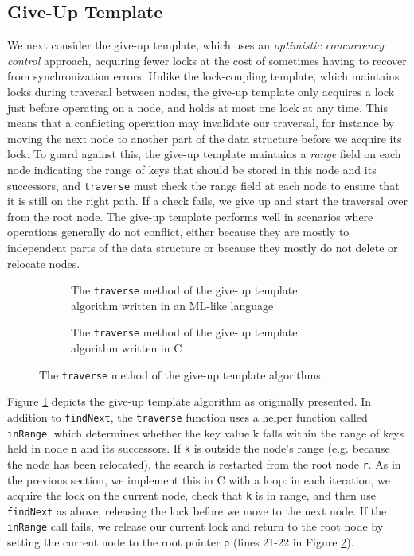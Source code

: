 \documentclass[a4paper,UKenglish,cleveref, autoref, thm-restate]{lipics-v2021}
\begin{document}
\subsection{Give-Up Template}
\label{give-up-algo}

We next consider the give-up template, which uses an \emph{optimistic concurrency control} approach, acquiring fewer locks at the cost of sometimes having to recover from synchronization errors. Unlike the lock-coupling template, which maintains locks during traversal between nodes, the give-up template only acquires a lock just before operating on a node, and holds at most one lock at any time. This means that a conflicting operation may invalidate our traversal, for instance by moving the next node to another part of the data structure before we acquire its lock. To guard against this, the give-up template maintains a \emph{range} field on each node indicating the range of keys that should be stored in this node and its successors, and \lstinline{traverse} must check the range field at each node to ensure that it is still on the right path. If a check fails, we give up and start the traversal over from the root node. The give-up template performs well in scenarios where operations generally do not conflict, either because they are mostly to independent parts of the data structure or because they mostly do not delete or relocate nodes.

\begin{figure}[!ht]
	\begin{subfigure}[t]{0.45\textwidth}
		 
		\caption{The \lstinline{traverse} method of the give-up template algorithm written in an ML-like language}
		\label{traverse_giveup_a}	
	\end{subfigure}\qquad
	\begin{subfigure}[t]{0.48\textwidth}
		 
		\caption{The \lstinline{traverse} method of the give-up template algorithm written in C}
		\label{traverse_giveup_b}
	\end{subfigure}
	\caption{The \lstinline{traverse} method of the give-up template algorithms}
	\label{traverse_giveup}
\end{figure}

Figure \ref{traverse_giveup_a} depicts the give-up template algorithm as originally presented. In addition to \lstinline{findNext}, the \lstinline{traverse} function uses a helper function called \lstinline{inRange}, which determines whether the key value $\texttt{k}$ falls within the range of keys held in node $\texttt{n}$ and its successors. If \lstinline{k} is outside the node's range (e.g. because the node has been relocated), the search is restarted from the root node \lstinline{r}. As in the previous section, we implement this in C with a loop: in each iteration, we acquire the lock on the current node, check that \lstinline{k} is in range, and then use \lstinline{findNext} as above, releasing the lock before we move to the next node. If the \lstinline{inRange} call fails, we release our current lock and return to the root node by setting the current node to the root pointer \lstinline{p} (lines 21-22 in Figure \ref{traverse_giveup_b}).
\end{document}
